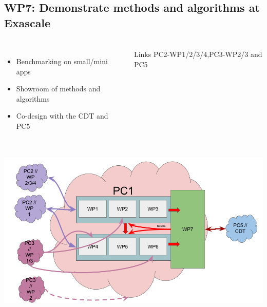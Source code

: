 \subsection{WP7: Demonstrate methods and algorithms at Exascale}
\begin{frame}
  \frametitle{\insertsectionhead}
  \framesubtitle{\insertsubsectionhead}

  \begin{columns}
    \begin{itemize}
      \item Benchmarking on small/mini apps 
      \item Showroom of methods and algorithms
      \item Co-design with the CDT and PC5
    \end{itemize}
    \begin{alertblock}{Links}
      PC2-WP1/2/3/4,PC3-WP2/3 and PC5
    \end{alertblock}
   
  \end{columns}
\end{frame}

\begin{frame}[plain]
  \frametitle{}
  \framesubtitle{}

  \begin{center}
    \includegraphics[width=.9\linewidth]{../../figures/exama-pc.png}
  \end{center}

  

\end{frame}


